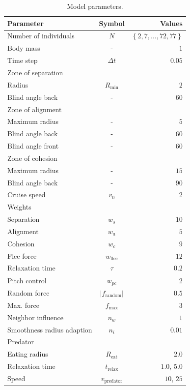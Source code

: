 \documentclass[11pt,a4paper]{article}
\begin{document}
\begin{table}[H]
  \centering
   \caption{Model parameters.}
  \begin{tabular}{l | c | r}
    \hline
    \textbf{Parameter} & \textbf{Symbol} & \textbf{Values}\\
    \hline
    Number of individuals & $N$ & $\left\{2, 7, \ldots, 72, 77 \right\}$\\
    Body mass & - & $1$\\
    Time step & $\Delta t$ & $0.05$\\
    \hline
    \multicolumn{3}{l}{Zone of separation}\\
    \hline
    \; Radius & $R_{\text{min}}$ & $2$\\
    \; Blind angle back & - & $60$\\
    \hline
    \multicolumn{3}{l}{Zone of alignment}\\
    \hline
    \; Maximum radius & - & $5$\\
    \; Blind angle back & - & $60$\\
    \; Blind angle front & - & $60$\\
    \hline
    \multicolumn{3}{l}{Zone of cohesion}\\
    \hline
    \; Maximum radius & - & $15$\\
    \; Blind angle back & - & $90$\\
    \; Cruise speed & $v_0$ & $2$\\
    \hline
    \multicolumn{3}{l}{Weights}\\
    \hline
    \; Separation & $w_s$ & $10$\\
    \; Alignment & $w_a$ & $5$\\
    \; Cohesion & $w_c$ & $9$\\
    \; Flee force & $w_{\text{flee}}$ & $12$\\
    \; Relaxation time & $\tau$ & $0.2$\\
    \; Pitch control & $w_{pc}$ & $2$\\
    \; Random force & $|f_{\text{random}}|$ & $0.5$\\
    \; Max. force & $f_{\text{max}}$ & $3$\\
    \; Neighbor influence & $n_w$ & $1$\\
    \; Smoothness radius adaption & $n_i$ & $0.01$\\
    \hline
    \multicolumn{3}{l}{Predator}\\
    \hline
    \; Eating radius & $R_\text{eat}$ & $2.0$\\
    \; Relaxation time & $t_{\text{relax}}$ & $1.0$, $5.0$\\
    \; Speed & $v_{\text{predator}}$ & $10$, $25$ \\ \hline 
  \end{tabular}
  \label{tab:param}
\end{table}
\end{document}
